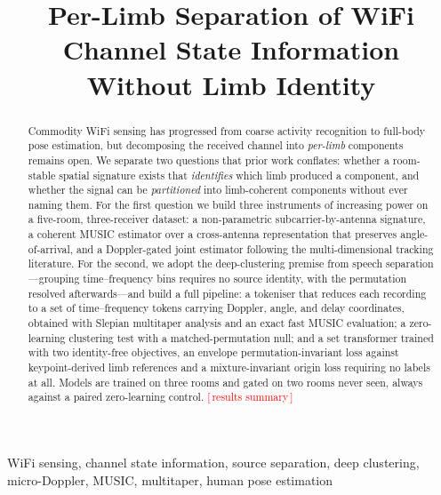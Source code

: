 \documentclass[conference]{IEEEtran}
\newcommand{\resultslot}[1]{\textcolor{red}{[\,#1\,]}}
\begin{document}
\title{Per-Limb Separation of WiFi Channel State Information\\
Without Limb Identity}

\author{
}

\maketitle

\begin{abstract}
Commodity WiFi sensing has progressed from coarse activity recognition to
full-body pose estimation, but decomposing the received channel into
\emph{per-limb} components remains open. We separate two questions that prior
work conflates: whether a room-stable spatial signature exists that
\emph{identifies} which limb produced a component, and whether the signal can
be \emph{partitioned} into limb-coherent components without ever naming them.
For the first question we build three instruments of increasing power on a
five-room, three-receiver dataset: a non-parametric subcarrier-by-antenna
signature, a coherent MUSIC estimator over a cross-antenna representation that
preserves angle-of-arrival, and a Doppler-gated joint estimator following the
multi-dimensional tracking literature. For the second, we adopt the
deep-clustering premise from speech separation---grouping time--frequency bins
requires no source identity, with the permutation resolved afterwards---and
build a full pipeline: a tokeniser that reduces each recording to a set of
time--frequency tokens carrying Doppler, angle, and delay coordinates, obtained
with Slepian multitaper analysis and an exact fast MUSIC evaluation; a
zero-learning clustering test with a matched-permutation null; and a set
transformer trained with two identity-free objectives, an
envelope permutation-invariant loss against keypoint-derived limb references
and a mixture-invariant origin loss requiring no labels at all. Models are
trained on three rooms and gated on two rooms never seen, always against a
paired zero-learning control. \resultslot{results summary}
\end{abstract}

\begin{IEEEkeywords}
WiFi sensing, channel state information, source separation, deep clustering,
micro-Doppler, MUSIC, multitaper, human pose estimation
\end{IEEEkeywords}
\end{document}
